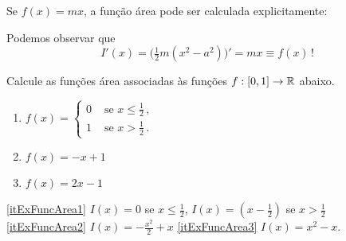 \begin{ex}
Se $f(x)=mx$, a função área pode ser calculada explicitamente:
\begin{center}
\begin{bmlimage}\end{bmlimage}
\end{center}
Podemos observar que 
$$I'(x)=\bigl(\tfrac12 m(x^2-a^2)\bigr)'=mx\equiv f(x)\,!$$
\end{ex}

\begin{exo} Calcule as funções área associadas às 
funções $f:[0,1]\to \mathbb{R}$ abaixo.
\begin{multicols}{3}
\begin{enumerate}
\item\label{itExFuncArea1} $\displaystyle{f(x)=
\begin{cases}
 0&\text{ se }x\leq \frac12\,,\\
 1&\text{ se }x> \frac12\,.
\end{cases}
}$
\item\label{itExFuncArea2} $f(x)=-x+1$
\item\label{itExFuncArea3} $f(x)=2x-1$
\end{enumerate}
\end{multicols}
\vspace{0.01cm}
\begin{sol}
\eqref{itExFuncArea1} $I(x)=0$ se $x\leq \frac12$, $I(x)=(x-\frac12)$ se
$x>\frac12$
\eqref{itExFuncArea2} $I(x)=-\frac{x^2}{2}+x$
\eqref{itExFuncArea3} $I(x)=x^2-x$.
\end{sol}
\end{exo}

